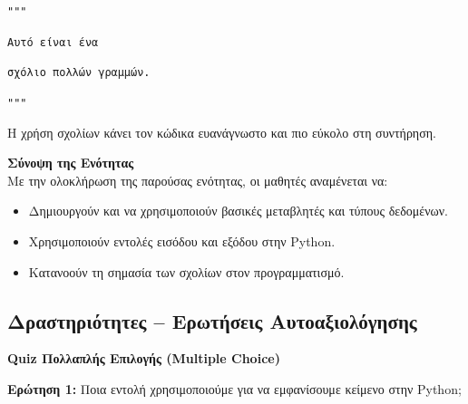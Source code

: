 \documentclass[11pt]{report}
\begin{document}
\begin{tcolorbox}[colback=gray!5!white, colframe=black!75!black]
\texttt{"""}

\texttt{Αυτό είναι ένα}

\texttt{σχόλιο πολλών γραμμών.}

\texttt{"""}
\end{tcolorbox}

\vspace{1em}
Η χρήση σχολίων κάνει τον κώδικα ευανάγνωστο και πιο εύκολο στη συντήρηση.

\vspace{1em}
\textbf{Σύνοψη της Ενότητας} \\[0.5em]
Με την ολοκλήρωση της παρούσας ενότητας, οι μαθητές αναμένεται να:

\begin{itemize}
    \item Δημιουργούν και να χρησιμοποιούν βασικές μεταβλητές και τύπους δεδομένων.
    \item Χρησιμοποιούν εντολές εισόδου και εξόδου στην Python.
    \item Κατανοούν τη σημασία των σχολίων στον προγραμματισμό.
\end{itemize}

\subsection*{Δραστηριότητες – Ερωτήσεις Αυτοαξιολόγησης}
\textbf{Quiz Πολλαπλής Επιλογής (Multiple Choice)} 

\vspace{1em}
\textbf{Ερώτηση 1:} Ποια εντολή χρησιμοποιούμε για να εμφανίσουμε κείμενο στην Python;
\end{document}
